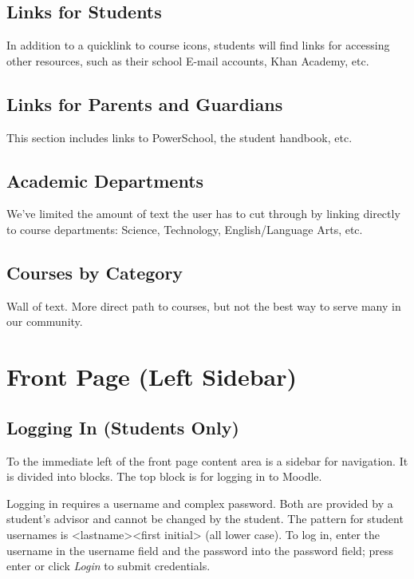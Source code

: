 \documentclass[letterpaper,10pt,english]{sphinxmanual}
\begin{document}
\subsection{Links for Students}
\label{moodle:links-for-students}
In addition to a quicklink to course icons, students will find links for accessing other resources, such as their school E-mail accounts, Khan Academy, etc.


\subsection{Links for Parents and Guardians}
\label{moodle:links-for-parents-and-guardians}
This section includes links to PowerSchool, the student handbook, etc.


\subsection{Academic Departments}
\label{moodle:academic-departments}
We've limited the amount of text the user has to cut through by linking directly to course departments: Science, Technology, English/Language Arts, etc.


\subsection{Courses by Category}
\label{moodle:courses-by-category}
Wall of text. More direct path to courses, but not the best way to serve many in our community.


\section{Front Page (Left Sidebar)}
\label{moodle:front-page-left-sidebar}

\subsection{Logging In (Students Only)}
\label{moodle:logging-in-students-only}
To the immediate left of the front page content area is a sidebar for navigation. It is divided into blocks. The top block is for logging in to Moodle.

Logging in requires a username and complex password. Both are provided by a student's advisor and cannot be changed by the student. The pattern for student usernames is \textless{}lastname\textgreater{}\textless{}first initial\textgreater{} (all lower case). To log in, enter the username in the username field and the password into the password field; press enter or click \emph{Login} to submit credentials.
\end{document}
